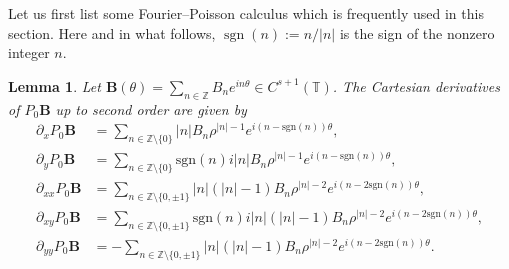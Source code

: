 \documentclass[12pt,reqno]{amsart}
\numberwithin{equation}{section}
\newtheorem{lemma}[theorem]{Lemma}
\theoremstyle{definition}
\theoremstyle{remark}
\begin{document}
Let us first list some Fourier--Poisson calculus which is frequently used in this section. Here and in what follows, $\operatorname{sgn}(n) := n/|n|$ is the sign of the nonzero integer $n$.


\begin{lemma} \label{lem:poisson-calculus}
Let $\textbf{B}(\theta)=\sum_{n\in\mathbb Z}B_ne^{in\theta}\in C^{s+1}(\mathbb T)$.  The Cartesian derivatives of $ P_0\textbf{B} $ up to second order are given by 
\begin{equation}\label{eq:Poisson-derivatives1}
\begin{split}
\partial_xP_0\textbf{B}&=\sum_{n\in\mathbb Z\setminus\{0\}}|n|B_n\rho^{|n|-1}e^{i(n-\text{sgn}(n))\theta},\\
\partial_yP_0\textbf{B}&=\sum_{n\in\mathbb Z\setminus\{0\}}\text{sgn}(n)i|n|B_n\rho^{|n|-1}e^{i(n-\text{sgn}(n))\theta},\\
\partial_{xx}P_0\textbf{B}&=\sum_{n\in\mathbb Z\setminus\{0,\pm1\}}|n|(|n|-1)B_n\rho^{|n|-2}e^{i(n-2\text{sgn}(n))\theta},\\
\partial_{xy}P_0\textbf{B}&=\sum_{n\in\mathbb Z\setminus\{0,\pm1\}}\text{sgn}(n)i|n|(|n|-1)B_n\rho^{|n|-2}e^{i(n-2\text{sgn}(n))\theta},\\
\partial_{yy}P_0\textbf{B}&=-\sum_{n\in\mathbb Z\setminus\{0,\pm1\}}|n|(|n|-1)B_n\rho^{|n|-2}e^{i(n-2\text{sgn}(n))\theta}.
\end{split}
\end{equation}

\end{lemma}
\end{document}
